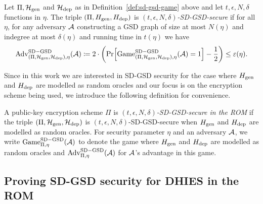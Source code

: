 \begin{definition}
	Let $\Pi, \mathcal{H}_\mathrm{gen}$ and $\mathcal{H}_\mathrm{dep}$ as in Definition~\ref{def:sd-gsd-game} above and let $t, \epsilon, N, \delta$ functions in $\eta$.
	The triple $(\Pi, H_\mathrm{gen}, H_\mathrm{dep})$ is \emph{$(t, \epsilon, N, \delta)$-SD-GSD-secure} if for all $\eta$, for any adversary $\mathcal{A}$ constructing a GSD graph of size at most $N(\eta)$ and indegree at most $\delta(\eta)$ and running time in $t(\eta)$ we have
	\begin{align*}
		\advantage{(\Pi, \fhgen, \fhdep)}{\eta}{SD-GSD}(\adv) \coloneqq 2 \cdot \left(\pr{\game{(\Pi, \fhgen, \fhdep)}{\eta}{SD-GSD}(\adv) = 1} - \frac{1}{2}\right) \le \epsilon(\eta).
	\end{align*}
\end{definition}

Since in this work we are interested in SD-GSD security for the case where $H_\mathrm{gen}$ and $H_\mathrm{dep}$ are modelled as random oracles and our focus is on the encryption scheme being used, we introduce the following definition for convenience.

\begin{definition}
	A public-key encryption scheme $\Pi$ is \emph{$(t, \epsilon, N, \delta)$-SD-GSD-secure in the ROM} if the triple $(\Pi, \mathcal{H}_\mathrm{gen}, \mathcal{H}_\mathrm{dep})$ is $(t, \epsilon, N, \delta)$-SD-GSD-secure when $H_\mathrm{gen}$ and $H_\mathrm{dep}$ are modelled as random oracles. For security parameter $\eta$ and an adversary $\mathcal{A}$, we write $\mathrm{Game}_{\Pi, \eta}^{\mathrm{SD-GSD}}(\mathcal{A})$ to denote the game where $H_\mathrm{gen}$ and $H_\mathrm{dep}$ are modelled as random oracles and $\mathrm{Adv}_{\Pi, \eta}^{\mathrm{SD-GSD}}(\mathcal{A})$ for $\mathcal{A}$'s advantage in this game.
\end{definition}

\subsection{Proving SD-GSD security for DHIES in the ROM}

